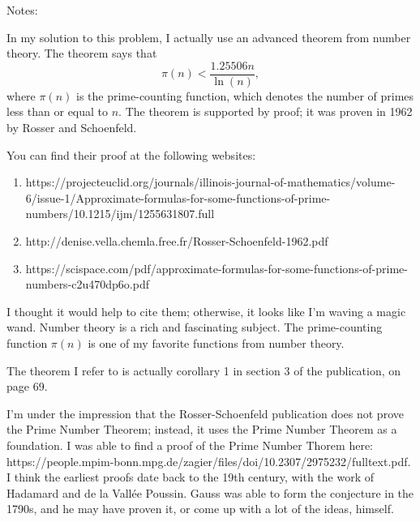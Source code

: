 Notes:

In my solution to this problem, I actually use an advanced theorem from number theory. The theorem says that $$\pi(n) < \frac{1.25506n}{\ln(n)},$$ where $\pi(n)$ is the prime-counting function, which denotes the number of primes less than or equal to $n$. The theorem is supported by proof; it was proven in 1962 by Rosser and Schoenfeld.

You can find their proof at the following websites:

\begin{enumerate}
\item https://projecteuclid.org/journals/illinois-journal-of-mathematics/volume-6/issue-1/Approximate-formulas-for-some-functions-of-prime-numbers/10.1215/ijm/1255631807.full
\item http://denise.vella.chemla.free.fr/Rosser-Schoenfeld-1962.pdf
\item https://scispace.com/pdf/approximate-formulas-for-some-functions-of-prime-numbers-c2u470dp6o.pdf
\end{enumerate}

I thought it would help to cite them; otherwise, it looks like I'm waving a magic wand. Number theory is a rich and fascinating subject. The prime-counting function $\pi(n)$ is one of my favorite functions from number theory.

The theorem I refer to is actually corollary 1 in section 3 of the publication, on page 69.

I'm under the impression that the Rosser-Schoenfeld publication does not prove the Prime Number Theorem; instead, it uses the Prime Number Theorem as a foundation. I was able to find a proof of the Prime Number Thorem here: https://people.mpim-bonn.mpg.de/zagier/files/doi/10.2307/2975232/fulltext.pdf. I think the earliest proofs date back to the 19th century, with the work of Hadamard and de la Vallée Poussin. Gauss was able to form the conjecture in the 1790s, and he may have proven it, or come up with a lot of the ideas, himself.
